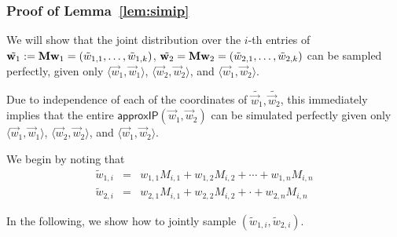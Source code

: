 \subsubsection{Proof of Lemma~\ref{lem:simip}}\label{apx:pfLemma10}
We will show that the joint distribution over the $i$-th entries of
$\tilde{\mathbf{w}_1} := \mathbf{M} \mathbf{w}_1 = (\tilde w_{1,1}, \ldots, \tilde w_{1,k})$,
$\tilde{\mathbf{w}_2} = \mathbf{M} \mathbf{w}_2 = (\tilde w_{2,1}, \ldots, \tilde w_{2,k})$
can be sampled perfectly, given only $\langle \vec{w}_1, \vec{w}_1 \rangle$,
$\langle \vec{w}_2, \vec{w}_2 \rangle$, and $\langle \vec{w}_1, \vec{w}_2
\rangle$.  

Due to independence of each of the coordinates of $\tilde{\vec{w}_1},
\tilde{\vec{w}_2}$, this immediately implies that the entire
$\mathsf{approxIP}(\vec{w}_1, \vec{w}_2)$ can be simulated perfectly given only
$\langle \vec{w}_1, \vec{w}_1 \rangle$, $\langle \vec{w}_2, \vec{w}_2 \rangle$,
and $\langle \vec{w}_1, \vec{w}_2 \rangle$.

\noindent
We begin by noting that
\begin{eqnarray*}
\tilde{w}_{1,i}  &=& w_{1,1} M_{i,1} + w_{1,2} M_{i,2} + \cdots + w_{1,n} M_{i,n} \\
\tilde{w}_{2,i}  &=& w_{2,1} M_{i,1} + w_{2,2} M_{i,2} + \cdot + w_{2,n} M_{i,n}
\end{eqnarray*}

\noindent
In the following, we show how to jointly sample
$(\tilde{w}_{1,i}, \tilde{w}_{2,i})$.

